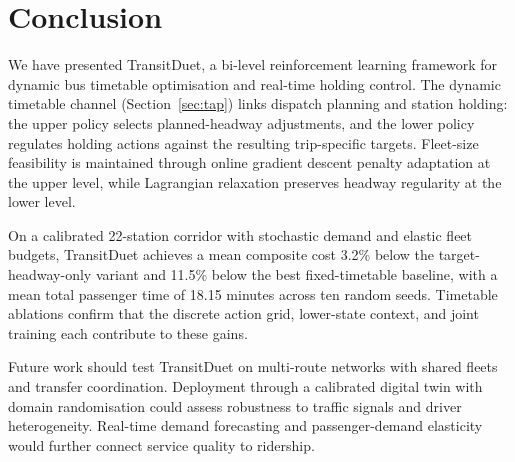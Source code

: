 \section{Conclusion}
\label{sec:conclusion}

We have presented TransitDuet, a bi-level reinforcement learning framework for dynamic bus timetable optimisation and real-time holding control.
The dynamic timetable channel (Section~\ref{sec:tap}) links dispatch planning and station holding: the upper policy selects planned-headway adjustments, and the lower policy regulates holding actions against the resulting trip-specific targets.
Fleet-size feasibility is maintained through online gradient descent penalty adaptation at the upper level, while Lagrangian relaxation preserves headway regularity at the lower level.

On a calibrated 22-station corridor with stochastic demand and elastic fleet budgets, TransitDuet achieves a mean composite cost 3.2\% below the target-headway-only variant and 11.5\% below the best fixed-timetable baseline, with a mean total passenger time of 18.15 minutes across ten random seeds.
Timetable ablations confirm that the discrete action grid, lower-state context, and joint training each contribute to these gains.

Future work should test TransitDuet on multi-route networks with shared fleets and transfer coordination. Deployment through a calibrated digital twin with domain randomisation could assess robustness to traffic signals and driver heterogeneity. Real-time demand forecasting and passenger-demand elasticity would further connect service quality to ridership.
